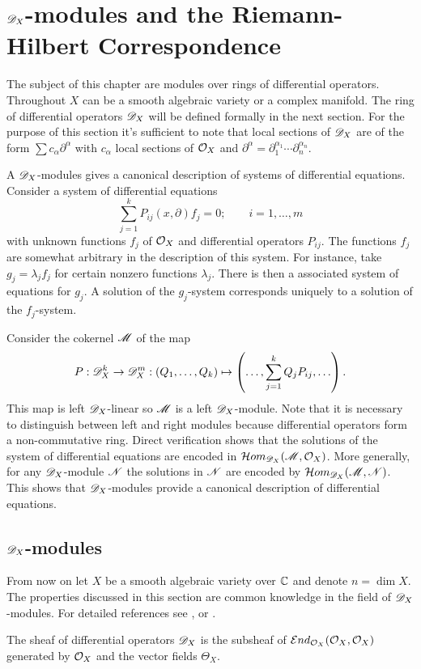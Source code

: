 \chapter{$\mathscr{D}_X$-modules and the Riemann-Hilbert Correspondence}\label{Ch: Chapter1}
The subject of this chapter are modules over rings of differential operators.
Throughout $X$ can be a smooth algebraic variety or a complex manifold.
The ring of differential operators $\mathscr{D}_X$ will be defined formally in the next section.
For the purpose of this section it's sufficient to note that local sections of $\mathscr{D}_X$ are of the form $\sum c_{\alpha } \partial^\alpha$ with $c_{\alpha}$ local sections of $\mathcal{O}_X$ and $\partial^\alpha = \partial_1^{\alpha_1}\cdots \partial_n^{\alpha_n}$.

A $\mathscr{D}_X$-modules gives a canonical description of systems of differential equations.
Consider a system of differential equations
$$\sum_{j=1}^k P_{ij}(x,\partial) f_j = 0; \qquad i= 1,\ldots,m$$
with unknown functions $f_j$ of $\mathcal{O}_X$ and differential operators $P_{ij}$.
The functions $f_j$ are somewhat arbitrary in the description of this system.
For instance, take $g_j=\lambda_j f_j$ for certain nonzero functions $\lambda_j$.
There is then a associated system of equations for $g_j$.
A solution of the $g_j$-system corresponds uniquely to a solution of the $f_j$-system.

Consider the cokernel $\mathscr{M}$ of the map
$$P:\mathscr{D}_X^k \to \mathscr{D}_X^m : \left(Q_1,\ldots, Q_k\right) \mapsto \left(\ldots, \sum_{j=1}^k Q_j P_{ij},\ldots\right).$$
This map is left $\mathscr{D}_X$-linear so $\mathscr{M}$ is a left $\mathscr{D}_X$-module.
Note that it is necessary to distinguish between left and right modules because differential operators form a non-commutative ring.
Direct verification shows that the solutions of the system of differential equations are encoded in $\mathcal{H}om_{\mathscr{D}_X}(\mathscr{M},\mathcal{O}_X)$.
More generally, for any $\mathscr{D}_X$-module $\mathscr{N}$ the solutions in $\mathscr{N}$ are encoded by $\mathcal{H}om_{\mathscr{D}_X}(\mathscr{M},\mathscr{N})$.
This shows that $\mathscr{D}_X$-modules provide a canonical description of differential equations.
\section{$\mathscr{D}_X$-modules}
From now on let $X$ be a smooth algebraic variety over $\mathbb{C}$ and denote $n= \dim X$.
The properties discussed in this section are common knowledge in the field of $\mathscr{D}_X$-modules.
For detailed references see \cite{bjork1979rings}, \cite{kashiwara2003d} or \cite{hotta2007d}.

\begin{definition}
  The sheaf of differential operators $\mathscr{D}_X$ is the subsheaf of $\mathcal{E}nd_{\mathcal{O}_X}(\mathcal{O}_X,\mathcal{O}_X)$ generated by $\mathcal{O}_X$ and the vector fields $\Theta_X$.
\end{definition}
